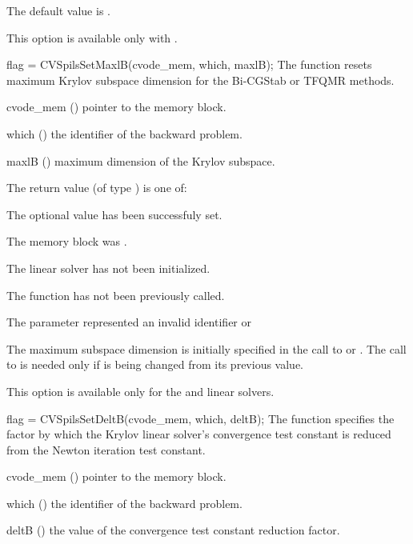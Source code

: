 {
  The default value is .

  {\warn}This option is available only with {\cvspgmr}.
}
{
  flag = CVSpilsSetMaxlB(cvode\_mem, which, maxlB);
}
{
  The function  resets maximum Krylov subspace
  dimension for the Bi-CGStab or TFQMR 
  methods.
}
{
  \begin{args}
  \item[cvode\_mem] ()
    pointer to the {\cvodes} memory block.
  \item[which] ()
    the identifier of the backward problem.
  \item[maxlB] ()
    maximum dimension of the Krylov subspace.
  \end{args}
}
{
  The return value  (of type ) is one of:
  \begin{args}
  \item[\Id{CVSPILS\_SUCCESS}] 
    The optional value has been successfuly set.
  \item[\Id{CVSPILS\_MEM\_NULL}]
    The  memory block was .
  \item[\Id{CVSPILS\_LMEM\_NULL}]
    The {\cvspils} linear solver has not been initialized.
  \item[\Id{CVSPILS\_NO\_ADJ}]
    The function  has not been previously called.
  \item[\Id{CVSPILS\_ILL\_INPUT}]
    The parameter  represented an invalid identifier or 
  \end{args}
}
{
  The maximum subspace dimension is initially specified in the call
  to  or .
  The call to  is needed only if  is being changed from its 
  previous value.

  {\warn}This option is available only for the {\cvspbcg} and {\cvsptfqmr} linear solvers.

}
{
  flag = CVSpilsSetDeltB(cvode\_mem, which, deltB);
}
{
  The function  specifies the factor by
  which the Krylov linear solver's convergence test constant is reduced
  from the Newton iteration test constant.
}
{
  \begin{args}
  \item[cvode\_mem] ()
    pointer to the {\cvodes} memory block.
  \item[which] ()
    the identifier of the backward problem.
  \item[deltB] ()
    the value of the convergence test constant reduction factor.
  \end{args}
}
